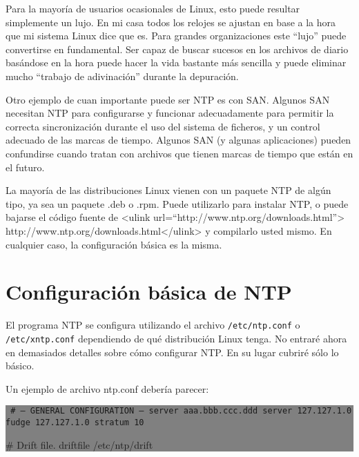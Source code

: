 \documentclass[12pt]{article}
\begin{document}
Para la mayoría de usuarios ocasionales de Linux, esto puede resultar
simplemente un lujo. En mi casa todos los relojes se ajustan en base a 
la hora que mi sistema Linux dice que es. Para grandes organizaciones 
este ``lujo'' puede convertirse en fundamental. Ser capaz de buscar sucesos 
en los archivos de diario basándose en la hora puede hacer la vida 
bastante más sencilla y puede eliminar mucho ``trabajo de adivinación'' 
durante la depuración.



Otro ejemplo de cuan importante puede ser NTP es con SAN. Algunos SAN
necesitan NTP para configurarse y funcionar adecuadamente para permitir
la correcta sincronización durante el uso del sistema de ficheros, y un
control adecuado de las marcas de tiempo. Algunos SAN (y algunas
aplicaciones) pueden confundirse cuando tratan con archivos que tienen marcas
de tiempo que están en el futuro.



La mayoría de las distribuciones Linux vienen con un paquete NTP de
algún tipo, ya sea un paquete .deb o .rpm. Puede utilizarlo para instalar
NTP, o puede bajarse el código fuente de
<ulink url=``http://www.ntp.org/downloads.html''>
http://www.ntp.org/downloads.html</ulink> y compilarlo usted mismo. En
cualquier caso, la configuración básica es la misma.





\section*{ Configuración básica de NTP}


El programa NTP se configura utilizando el archivo \texttt{/etc/ntp.conf} o
\texttt{/etc/xntp.conf} dependiendo de qué distribución Linux tenga. No entraré
ahora en demasiados detalles sobre cómo configurar NTP. En su lugar cubriré
sólo lo básico.



Un ejemplo de archivo ntp.conf debería parecer:



\colorbox{grey}{\parbox[t]{0.95\linewidth}{ \vspace*{0.5cm} {\tt
\# --- GENERAL CONFIGURATION ---
server  aaa.bbb.ccc.ddd
server  127.127.1.0
fudge   127.127.1.0 stratum 10

\# Drift file.
driftfile /etc/ntp/drift
 } \vspace*{0.5cm} } } 

	
\end{document}
